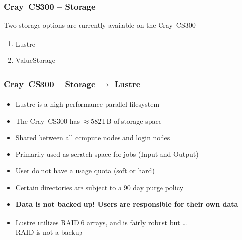 \documentclass[t,hyperref={pdfpagelabels=false}]{beamer}
\newcommand{\regtrademark}{\fontsize{5}{6}\selectfont \textsuperscript{\textregistered}}
\newcommand{\lustre}{Lustre{\regtrademark}}
\newcommand{\craycs}{Cray~CS300}
\begin{document}
\begin{frame}
	\frametitle{{\craycs} -- Storage}
	Two storage options are currently available on the {\craycs}
	\begin{enumerate}
		\item {\lustre}
		\item ValueStorage
	\end{enumerate}
\end{frame}


\begin{frame}
	\frametitle{{\craycs} -- Storage $\rightarrow$ {\lustre}}
	\begin{itemize}
		\item {\lustre} is a high performance parallel filesystem
		\item The {\craycs} has $\approx582$TB of storage space
		\item Shared between all compute nodes and login nodes
		\item Primarily used as scratch space for jobs (Input and Output)
		\item User do not have a usage quota (soft or hard)
		\item Certain directories are subject to a 90 day purge policy
		\item \textbf{Data is not backed up!  Users are responsible for their own data}
                \item {\lustre} utilizes RAID 6 arrays, and is fairly robust but \ldots~\\RAID is not a backup
	\end{itemize}
\end{frame}
\end{document}
